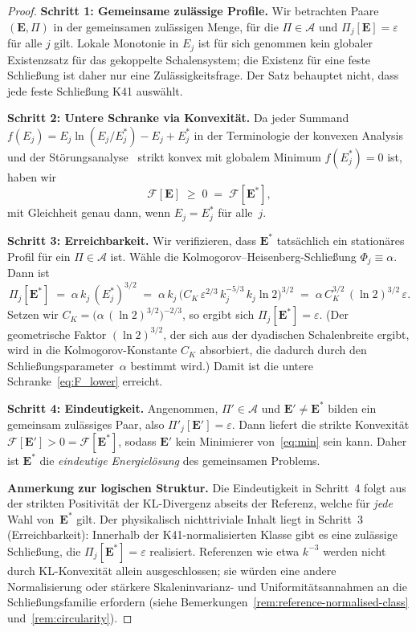 \documentclass[12pt,a4paper]{article}
\theoremstyle{definition}
\theoremstyle{plain}
\theoremstyle{remark}
\begin{document}
\begin{proof}
\textbf{Schritt 1: Gemeinsame zulässige Profile.}\;
Wir betrachten Paare $(\mathbf{E},\Pi)$ in der gemeinsamen zulässigen Menge,
für die $\Pi\in\mathscr{A}$ und $\Pi_j[\mathbf{E}]=\varepsilon$ für alle
$j$ gilt. Lokale Monotonie in $E_j$ ist für sich genommen kein globaler
Existenzsatz für das gekoppelte Schalensystem; die Existenz für eine feste
Schließung ist daher nur eine Zulässigkeitsfrage. Der Satz behauptet nicht,
dass jede feste Schließung K41 auswählt.

\textbf{Schritt 2: Untere Schranke via Konvexität.}\;
Da jeder Summand $f(E_j) = E_j\ln(E_j/E_j^*) - E_j + E_j^*$ in der Terminologie der konvexen Analysis und der
Störungsanalyse~\cite{Rockafellar70,BonnansShapiro00} strikt konvex mit globalem Minimum $f(E_j^*) = 0$ ist, haben wir
\begin{equation}\label{eq:F_lower}
  \mathcal{F}[\mathbf{E}]
  \;\ge\; 0
  \;=\; \mathcal{F}[\mathbf{E}^*],
\end{equation}
mit Gleichheit genau dann, wenn $E_j = E_j^*$ für alle~$j$.

\textbf{Schritt 3: Erreichbarkeit.}\;
Wir verifizieren, dass $\mathbf{E}^*$ tatsächlich ein stationäres Profil für
ein $\Pi \in \mathscr{A}$ ist. Wähle die Kolmogorov--Heisenberg-Schließung
$\Phi_j \equiv \alpha$. Dann ist
\[
  \Pi_j[\mathbf{E}^*]
  \;=\; \alpha\,k_j\,(E_j^*)^{3/2}
  \;=\; \alpha\,k_j\,
    \bigl(C_K\,\varepsilon^{2/3}\,k_j^{-5/3}\,k_j\ln 2\bigr)^{3/2}
  \;=\; \alpha\,C_K^{3/2}\,(\ln 2)^{3/2}\,\varepsilon.
\]
Setzen wir $C_K = \bigl(\alpha\,(\ln 2)^{3/2}\bigr)^{-2/3}$, so ergibt sich
$\Pi_j[\mathbf{E}^*] = \varepsilon$. (Der geometrische Faktor $(\ln 2)^{3/2}$,
der sich aus der dyadischen Schalenbreite ergibt, wird in die Kolmogorov-Konstante
$C_K$ absorbiert, die dadurch durch den Schließungsparameter~$\alpha$ bestimmt wird.)
Damit ist die untere Schranke~\eqref{eq:F_lower} erreicht.

\textbf{Schritt 4: Eindeutigkeit.}\;
Angenommen, $\Pi' \in \mathscr{A}$ und $\mathbf{E}' \ne \mathbf{E}^*$ bilden
ein gemeinsam zulässiges Paar, also $\Pi'_j[\mathbf{E}'] = \varepsilon$.
Dann liefert die strikte Konvexität
$\mathcal{F}[\mathbf{E}'] > 0 = \mathcal{F}[\mathbf{E}^*]$, sodass $\mathbf{E}'$
kein Minimierer von~\eqref{eq:min} sein kann. Daher ist $\mathbf{E}^*$ die
\emph{eindeutige Energielösung} des gemeinsamen Problems.

\smallskip\noindent
\textbf{Anmerkung zur logischen Struktur.}\;
Die Eindeutigkeit in Schritt~4 folgt aus der strikten Positivität der KL-Divergenz abseits der Referenz, welche für \emph{jede} Wahl
von~$\mathbf{E}^*$ gilt. Der physikalisch nichttriviale Inhalt liegt in
Schritt~3 (Erreichbarkeit): Innerhalb der K41-normalisierten Klasse gibt es
eine zulässige Schließung, die $\Pi_j[\mathbf{E}^*] = \varepsilon$
realisiert. Referenzen wie etwa $k^{-3}$ werden nicht durch KL-Konvexität
allein ausgeschlossen; sie würden eine andere Normalisierung oder stärkere
Skaleninvarianz- und Uniformitätsannahmen an die Schließungsfamilie
erfordern (siehe Bemerkungen~\ref{rem:reference-normalised-class}
und~\ref{rem:circularity}).


\end{proof}
\end{document}
